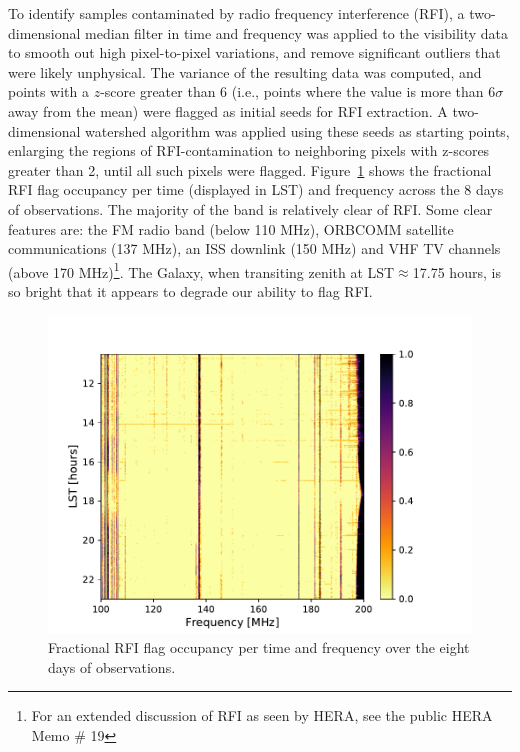 To identify samples contaminated by radio frequency interference (RFI), a two-dimensional median filter in time and frequency was applied to the visibility data to smooth out high pixel-to-pixel variations, and remove significant outliers that were likely unphysical. The variance of the resulting data was computed, and points with a $z$-score greater than 6 (i.e., points where the value is more than 6$\sigma$ away from the mean) were flagged as initial seeds for RFI extraction. A two-dimensional watershed algorithm was applied using these seeds as starting points, enlarging the regions of RFI-contamination to neighboring pixels with z-scores greater than 2, until all such pixels were flagged. Figure~\ref{fig:hera19_rfi} shows the fractional RFI flag occupancy per time (displayed in LST) and frequency across the 8 days of observations. The majority of the band is relatively clear of RFI. Some clear features are: the FM radio band (below 110 MHz), ORBCOMM satellite communications (137 MHz), an ISS downlink (150 MHz) and VHF TV channels (above 170 MHz)\footnote{For an extended discussion of RFI as seen by HERA, see the public HERA Memo \# 19}.
The Galaxy, when transiting zenith at LST$\approx$17.75 hours, is so bright that it appears to degrade our ability to flag RFI.

\begin{figure}
\centering
\includegraphics[scale=0.6]{chapters/eor_window_HERA/figures/frac_occ.pdf}
\caption{Fractional RFI flag occupancy per time and frequency over the eight days of observations.}
\label{fig:hera19_rfi}
\end{figure}

